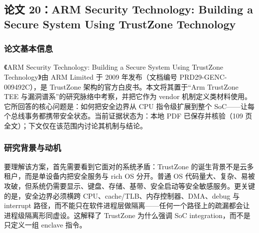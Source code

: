 \documentclass[11pt]{ctexart}
\begin{document}
\subsection{论文 20：ARM Security Technology: Building a Secure System Using TrustZone Technology}
\subsubsection{论文基本信息}
《ARM Security Technology: Building a Secure System Using TrustZone Technology》由 ARM Limited 于 2009 年发布（文档编号 PRD29-GENC-009492C），是 TrustZone 架构的官方白皮书。本文将其置于``Arm TrustZone TEE 与漏洞谱系''的研究脉络中考察，并把它作为 vendor 机制定义类材料使用。它所回答的核心问题是：如何把安全边界从 CPU 指令级扩展到整个 SoC——让每个总线事务都携带安全状态。当前证据状态为：本地 PDF 已保存并核验（109 页全文）；下文仅在该范围内讨论其机制与结论。\cite{arm_trustzone_whitepaper}\par
\subsubsection{研究背景与动机}
要理解该方案，首先需要看到它面对的系统矛盾：TrustZone 的诞生背景不是云多租户，而是单设备内把安全服务与 rich OS 分开。普通 OS 代码量大、复杂、易被攻破，但系统仍需要显示、键盘、存储、基带、安全启动等安全敏感服务。更关键的是，安全边界必须横跨 CPU、cache/TLB、内存控制器、DMA、debug 与 interrupt 路径，而不能只在软件进程层做隔离——任何一个路径上的疏漏都会让进程级隔离形同虚设。这解释了 TrustZone 为什么强调 SoC integration，而不是只定义一组 enclave 指令。\par
\end{document}
